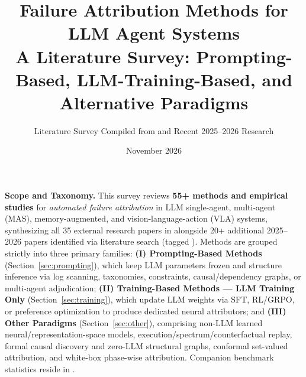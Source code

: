 \documentclass[10pt,a4paper]{article}
\title{\vspace{-8mm}\LARGE Failure Attribution Methods for LLM Agent Systems\\[4pt]\large A Literature Survey: Prompting-Based, LLM-Training-Based, and Alternative Paradigms}
\author{\normalsize Literature Survey Compiled from \code{papers/methods/} and Recent 2025--2026 Research}
\date{\normalsize November 2026}
\begin{document}
\maketitle\vspace{-6mm}

\begin{tcolorbox}[enhanced,colback=surface,colframe=rulec,boxrule=0.4pt,arc=2pt,left=7pt,right=7pt,top=5pt,bottom=5pt,fontupper=\small]
\textbf{Scope and Taxonomy.} This survey reviews \textbf{55+ methods and empirical studies} for \emph{automated failure attribution} in LLM single-agent, multi-agent (MAS), memory-augmented, and vision-language-action (VLA) systems, synthesizing all 35 external research papers in  alongside 20+ additional 2025--2026 papers identified via literature search (tagged \webtag{}). Methods are grouped strictly into three primary families:
\textbf{(I) Prompting-Based Methods} (Section~\ref{sec:prompting}), which keep LLM parameters frozen and structure inference via log scanning, taxonomies, constraints, causal/dependency graphs, or multi-agent adjudication;
\textbf{(II) Training-Based Methods --- LLM Training Only} (Section~\ref{sec:training}), which update LLM weights via SFT, RL/GRPO, or preference optimization to produce dedicated neural attributors; and
\textbf{(III) Other Paradigms} (Section~\ref{sec:other}), comprising non-LLM learned neural/representation-space models, execution/spectrum/counterfactual replay, formal causal discovery and zero-LLM structural graphs, conformal set-valued attribution, and white-box phase-wise attribution.
Companion benchmark statistics reside in .
\end{tcolorbox}

\tableofcontents








\vspace{6pt}


\end{document}
